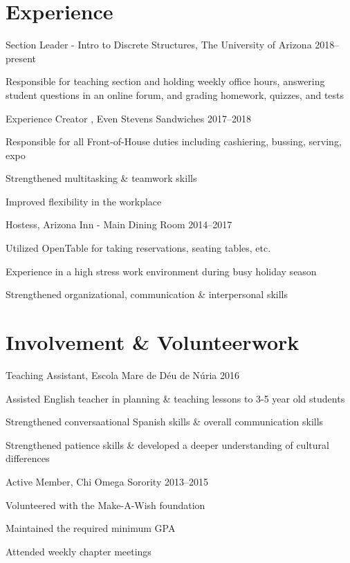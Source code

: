 \documentclass[]{friggeri-cv} %
\begin{document}
\section{Experience}
\begin{entrylist}

\entry%
{Section Leader - Intro to Discrete Structures{\normalfont , The University of Arizona}}%
{2018--present}
{%
	\item{Responsible for teaching section and holding weekly office hours, answering student questions in an online forum, and grading homework, quizzes, and tests}
}
\entry
{Experience Creator {\normalfont , Even Stevens Sandwiches}}
{2017--2018}
{%
	\item{Responsible for all Front-of-House duties including cashiering, bussing, serving, expo}
	\item{Strengthened multitasking \& teamwork skills}
	\item{Improved flexibility in the workplace}
}
\entry
{Hostess{\normalfont , Arizona Inn - Main Dining Room}}
{2014--2017}
{%
		\item{Utilized OpenTable for taking reservations, seating tables, etc.}
		\item{Experience in a high stress work environment during busy holiday season}
		\item{Strengthened organizational, communication \& interpersonal skills}%
}


\end{entrylist}

\section{Involvement \& Volunteerwork}
\begin{entrylist}
\entry
{Teaching Assistant{\normalfont , Escola Mare de D\'{e}u de N\'{u}ria}}
{2016}
{
	\item{Assisted English teacher in planning \& teaching lessons to 3-5 year old students}
	\item{Strengthened conversaational Spanish skills \& overall communication skills}
	\item{Strengthened patience skills \& developed a deeper understanding of cultural differences}
}

\entry
{Active Member{\normalfont , Chi Omega Sorority}}
{2013--2015}
{
	\item{Volunteered with the Make-A-Wish foundation}
	\item{Maintained the required minimum GPA}
	\item{Attended weekly chapter meetings}
}
\end{entrylist}
\end{document}
